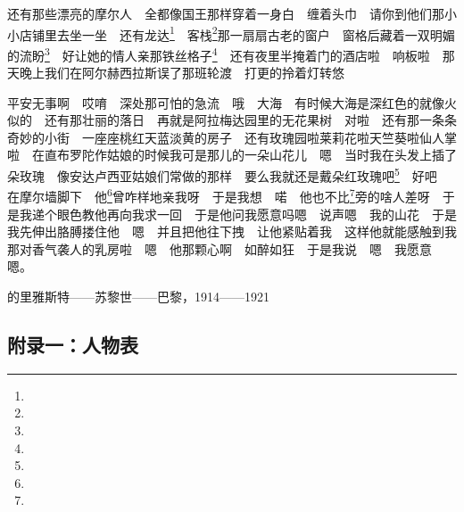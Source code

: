 \par 还有那些漂亮的摩尔人　全都像国王那样穿着一身白　缠着头巾　请你到他们那小小店铺里去坐一坐　还有龙达\footnote{}　客栈\footnote{}那一扇扇古老的窗户　窗格后藏着一双明媚的流盼\footnote{}　好让她的情人亲那铁丝格子\footnote{}　还有夜里半掩着门的酒店啦　响板啦　那天晚上我们在阿尔赫西拉斯误了那班轮渡　打更的拎着灯转悠　
\par 平安无事啊　哎唷　深处那可怕的急流　哦　大海　有时候大海是深红色的就像火似的　还有那壮丽的落日　再就是阿拉梅达园里的无花果树　对啦　还有那一条条奇妙的小街　一座座桃红天蓝淡黄的房子　还有玫瑰园啦莱莉花啦天竺葵啦仙人掌啦　在直布罗陀作姑娘的时候我可是那儿的一朵山花儿　嗯　当时我在头发上插了朵玫瑰　像安达卢西亚姑娘们常做的那样　要么我就还是戴朵红玫瑰吧\footnote{}　好吧　在摩尔墙脚下　他\footnote{}曾咋样地亲我呀　于是我想　喏　他也不比\footnote{}旁的啥人差呀　于是我递个眼色教他再向我求一回　于是他问我愿意吗嗯　说声嗯　我的山花　于是我先伸出胳膊搂住他　嗯　并且把他往下拽　让他紧贴着我　这样他就能感触到我那对香气袭人的乳房啦　嗯　他那颗心啊　如醉如狂　于是我说　嗯　我愿意　嗯。　
\par 的里雅斯特——苏黎世——巴黎，1914——1921
















\subsection*{附录一：人物表}

